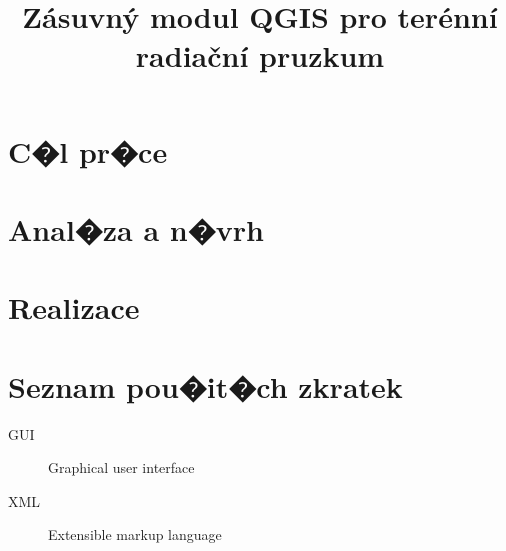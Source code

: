 \documentclass[thesis=B,czech]{FITthesis}[2012/06/26]
\title{Z{\' a}suvn{\' y} modul QGIS pro ter{\' e}nn{\' i} radia{\v c}n{\' i} pruzkum}
\begin{document}

\begin{introduction}
\end{introduction}

\chapter{C�l pr�ce}

\chapter{Anal�za a n�vrh}

\chapter{Realizace}

\begin{conclusion}
\end{conclusion}




\appendix

\chapter{Seznam pou�it�ch zkratek}
\begin{description}
	\item[GUI] Graphical user interface
	\item[XML] Extensible markup language
\end{description}
\end{document}
